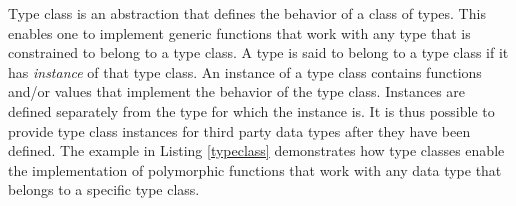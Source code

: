 \documentclass[language=english,version=draft,mainfont=none,minted=true]{utuftthesis}
\newcommand{\refsource}[1]{Listing \ref{#1}}
\begin{document}
Type class is an abstraction that defines the behavior of a class of types. This enables one to implement generic functions that work with any type that is constrained to belong to a type class. A type is said to belong to a type class if it has \emph{instance} of that type class. An instance of a type class contains functions and/or values that implement the behavior of the type class. Instances are defined separately from the type for which the instance is. It is thus possible to provide type class instances for third party data types after they have been defined. The example in \refsource{typeclass} demonstrates how type classes enable the implementation of polymorphic functions that work with any data type that belongs to a specific type class.


\end{document}
